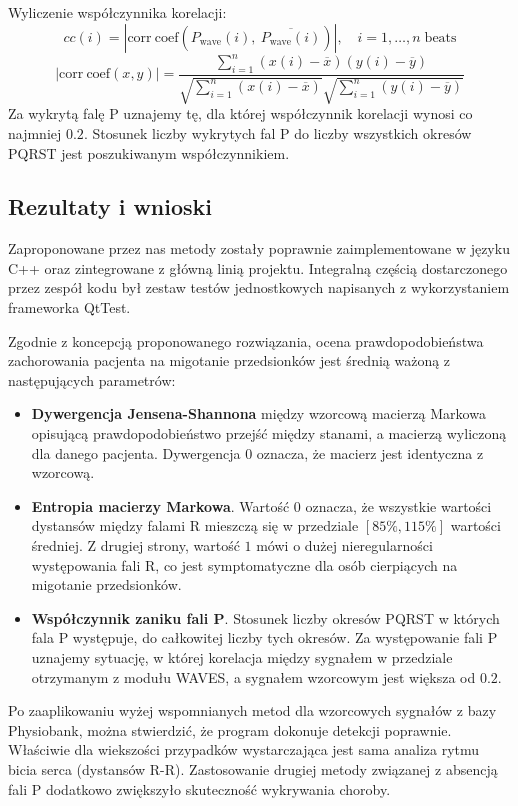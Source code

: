 Wyliczenie współczynnika korelacji:
\begin{equation}
cc(i) = |\mathrm{corr\:coef}(P_\mathrm{wave}(i),\: \overline{P_\mathrm{wave}(i)})|, \quad i = 1,\ldots,n\; \mathrm{beats}
\end{equation}
\begin{equation}
  |\mathrm{corr\:coef}(x,y)| = 
  \frac
      {\sum_{i=1}^{n}(x(i) - \overline{x})(y(i) - \overline{y})}
      {
        \sqrt{\sum_{i=1}^{n}(x(i) - \overline{x})}
        \sqrt{\sum_{i=1}^{n}(y(i) - \overline{y})}
      }
\end{equation}
Za wykrytą falę P uznajemy tę, dla której współczynnik korelacji wynosi co najmniej $0.2$.
Stosunek liczby wykrytych fal P do liczby wszystkich okresów PQRST jest poszukiwanym współczynnikiem.

\subsection{Rezultaty i wnioski}
Zaproponowane przez nas metody zostały poprawnie zaimplementowane w języku C++ oraz zintegrowane z główną linią projektu.
Integralną częścią dostarczonego przez zespół kodu był zestaw testów jednostkowych napisanych 
z wykorzystaniem frameworka QtTest.

Zgodnie z koncepcją proponowanego rozwiązania, ocena prawdopodobieństwa zachorowania pacjenta na migotanie przedsionków
jest średnią ważoną z następujących parametrów:
\begin{itemize}
 \item \textbf{Dywergencja Jensena-Shannona} między wzorcową macierzą Markowa opisującą prawdopodobieństwo przejść między stanami,
 a macierzą wyliczoną dla danego pacjenta. 
 Dywergencja $0$ oznacza, że macierz jest identyczna z wzorcową. 
 
 \item \textbf{Entropia macierzy Markowa}.
 Wartość $0$ oznacza, że wszystkie wartości dystansów między falami R mieszczą się w przedziale $[85\%,115\%]$ wartości średniej.
 Z drugiej strony, wartość $1$ mówi o dużej nieregularności występowania fali R, 
 co jest symptomatyczne dla osób cierpiących na migotanie przedsionków.
 
 \item \textbf{Współczynnik zaniku fali P}. 
 Stosunek liczby okresów PQRST w których fala P występuje, do całkowitej liczby tych okresów.
 Za występowanie fali P uznajemy sytuację, w której korelacja między sygnałem w przedziale otrzymanym z modułu WAVES,
 a sygnałem wzorcowym jest większa od $0.2$.
\end{itemize}
Po zaaplikowaniu wyżej wspomnianych metod dla wzorcowych sygnałów z bazy Physiobank, 
można stwierdzić, że program dokonuje detekcji poprawnie. 
Właściwie dla wiekszości przypadków wystarczająca jest sama analiza rytmu bicia serca (dystansów R-R).
Zastosowanie drugiej metody związanej z absencją fali P dodatkowo zwiększyło skuteczność wykrywania choroby.

